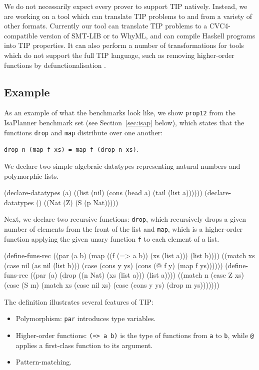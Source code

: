 \documentclass{llncs}
\begin{document}
We do not necessarily expect every prover to support TIP natively.
Instead, we are working on a tool which can translate TIP problems to
and from a variety of other formats. Currently our tool can translate
TIP problems to a CVC4-compatible version of SMT-LIB or to WhyML, and
can compile Haskell programs into TIP properties. It can also perform
a number of transformations for tools which do not support the full
TIP language, such as removing higher-order functions by
defunctionalisation \cite{defunc}.

\subsection*{Example}
As an example of what the benchmarks look like, we show \texttt{prop12} from the IsaPlanner benchmark set (see Section~\ref{sec:isap} below), which states that the functions \texttt{drop} and \texttt{map} distribute over one another: \begin{center} \texttt{drop n (map f xs) = map f (drop n xs)}.\end{center}
We declare two simple algebraic datatypes representing natural numbers and polymorphic lists.

\begin{code}
(declare-datatypes (a)
  ((list (nil) (cons (head a) (tail (list a))))))
(declare-datatypes () ((Nat (Z) (S (p Nat)))))
\end{code}

Next, we declare two recursive functions: \texttt{drop}, which recursively drops a given number of elements from the front of the list and \texttt{map}, which is a higher-order function applying the given unary function \texttt{f} to each element of a list.

\begin{code}
(define-funs-rec
  ((par (a b) (map ((f (=> a b)) (xs (list a))) (list b))))
  ((match xs
     (case nil (as nil (list b)))
     (case (cons y ys) (cons (@ f y) (map f ys))))))
(define-funs-rec
  ((par (a) (drop ((n Nat) (xs (list a))) (list a))))
  ((match n
     (case Z xs)
     (case (S m)
       (match xs
         (case nil xs)
         (case (cons y ys) (drop m ys)))))))
\end{code}

The definition illustrates several features of TIP:
\begin{itemize}
  \item Polymorphism: \verb|par| introduces type variables.
  \item Higher-order functions: \verb|(=> a b)| is the type of
    functions from \verb|a| to \verb|b|, while \verb|@| applies
    a first-class function to its argument.
  \item Pattern-matching.
\end{itemize}
\end{document}
